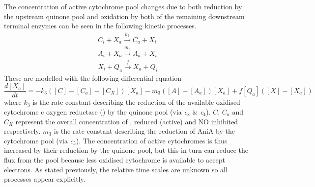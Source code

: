 The concentration of active cytochrome pool changes due to both reduction by the upstream quinone pool and oxidation by both of the remaining downstream terminal enzymes can be seen in the following kinetic processes.
\begin{equation*}
\begin{gathered}
C_i + X_a \xrightarrow{k_3} C_a + X_i\\
A_i + X_a \xrightarrow{m_3} A_a + X_i\\
X_i + Q_a \xrightarrow{f} X_a + Q_i
\end{gathered}
\end{equation*}
These are modelled with the following differential equation
\begin{equation}
\frac{d[X_a]}{dt} = -k_3([C] - [C_a] - [C_X])[X_a]  - m_3([A] - [A_a])[X_a] + f[Q_a]([X]-[X_a])
\label{eq:cytochromes}
\end{equation}
where $k_3$ is the rate constant describing the reduction of the available oxidised cytochrome c oxygen reductase (\cbbthree{}) by the quinone pool (via \textit{c$_{\textrm{x}}$} \& \textit{c$_{\textrm{4}}$}). $C$, $C_a$ and $C_X$ represent the overall concentration of \cbbthree{}, reduced (active) \cbbthree{} and NO inhibited \cbbthree{} respectively. $m_3$ is the rate constant describing the reduction of AniA by the cytochrome pool (via \textit{c$_{\textrm{5}}$}). The concentration of active cytochromes is thus increased by their reduction by the quinone pool, but this in turn can reduce the flux from the pool because less oxidised cytochrome is available to accept electrons. As stated previously, the relative time scales are unknown so all processes appear explicitly.

